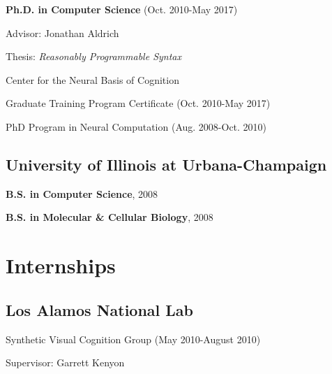 \documentclass[10pt,letterpaper]{article}
\renewenvironment{itemize}{
  \begin{list}{}{
    \setlength{\leftmargin}{1.25em}
    \setlength{\itemsep}{0.25em}
    \setlength{\parskip}{0pt}
    \setlength{\parsep}{0.2em}
  }
}{
  \end{list}
}
\begin{document}
\begin{itemize}
  \item \textbf{Ph.D. in Computer Science} (Oct. 2010-May 2017)
    \begin{itemize}
    \item Advisor: Jonathan Aldrich
    \item Thesis: \emph{Reasonably Programmable Syntax}
    \end{itemize}
  \item Center for the Neural Basis of Cognition
    \begin{itemize}
      \item Graduate Training Program Certificate (Oct. 2010-May 2017)
      \item PhD Program in Neural Computation (Aug. 2008-Oct. 2010)
    \end{itemize}
\end{itemize}

\subsection*{University of Illinois at Urbana-Champaign}
\begin{itemize}
  \item \textbf{B.S. in Computer Science}, 2008
  \item \textbf{B.S. in Molecular \& Cellular Biology}, 2008
\end{itemize}


\section*{Internships}
\subsection*{Los Alamos National Lab}
  \begin{itemize}
    \item Synthetic Visual Cognition Group (May 2010-August 2010)
    \item Supervisor: Garrett Kenyon
  \end{itemize}
\end{document}
